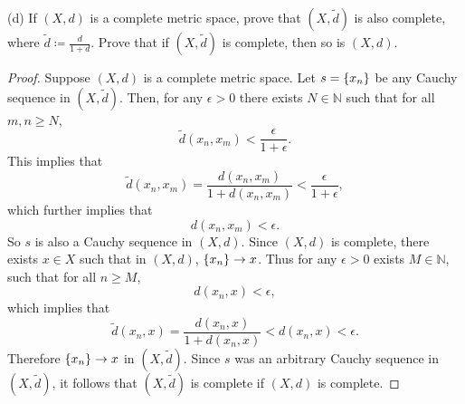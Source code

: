 \documentclass{article}
\newcommand{\N}{\mathbb{N}}
\begin{document}
\newpage

(d) If $(X, d)$ is a complete metric space, prove that $(X, \tilde{d})$
is also complete, where $\tilde{d} \coloneqq \frac{d}{1 + d}$. Prove
that if $(X, \tilde{d})$ is complete, then so is $(X, d)$.

\begin{proof}

Suppose $(X, d)$ is a complete metric space. Let $s = \cbr{x_n}$ be any
Cauchy sequence in $(X, \tilde{d})$. Then, for any $\epsilon > 0$
there exists $N \in \N$ such that for all $m, n \geq N$,
%
\begin{equation*}
    \tilde{d}(x_n, x_m) < \frac{\epsilon}{1 + \epsilon}
    .
\end{equation*}
%
This implies that
%
\begin{equation*}
    \tilde{d}(x_n, x_m)
        = \frac{d(x_n, x_m)}{1 + d(x_n, x_m)}
        < \frac{\epsilon}{1 + \epsilon}
        ,
\end{equation*}
%
which further implies that
%
\begin{equation*}
    d(x_n, x_m) < \epsilon
    .
\end{equation*}
%
So $s$ is also a Cauchy sequence in $(X, d)$. Since $(X, d)$ is
complete, there exists $x \in X$ such that in $(X, d)$, $\cbr{x_n} \to
x$. Thus for any $\epsilon > 0$ exists $M \in \N$, such that for
all $n \geq M$,
%
\begin{equation*}
    d(x_n, x) < \epsilon
    ,
\end{equation*}
%
which implies that
%
\begin{equation*}
    \tilde{d}(x_n, x)
        = \frac{d(x_n, x)}{1 + d(x_n, x)} < d(x_n, x) < \epsilon
    .
\end{equation*}
%
Therefore $\cbr{x_n} \to x$ in $(X, \tilde{d})$. Since $s$ was an
arbitrary Cauchy sequence in $(X, \tilde{d})$, it follows that $(X,
\tilde{d})$ is complete if $(X, d)$ is complete.


\end{proof}
\end{document}
